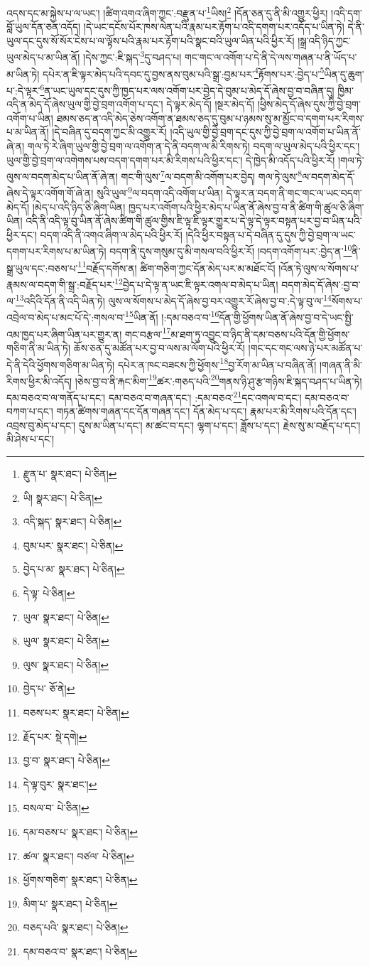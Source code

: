 འདས་དང་མ་སྐྱེས་པ་ལ་ཡང་། །ཚིག་འགའ་ཞིག་ཀྱང་:བརྫུན་པ་\footnote{རྫུན་པ་  སྣར་ཐང་།  པེ་ཅིན། }ཡིས།\footnote{ཡི།  སྣར་ཐང་།  པེ་ཅིན། } །དོན་ཅན་དུ་ནི་མི་འགྱུར་ཕྱིར། །འདི་དག་བློ་ཡུལ་དོན་ཅན་འདོད། །དེ་ཡང་དངོས་པོར་ཁས་ལེན་པའི་རྣམ་པར་རྟོག་པ་འདི་དགག་པར་འདོད་པ་ཡིན་ཏེ། དེ་ནི་ཡུལ་དང་དུས་སོ་སོར་ངེས་པ་ལ་ལྟོས་པའི་རྣམ་པར་རྟོག་པའི་སྣང་བའི་ཡུལ་ཡིན་པའི་ཕྱིར་རོ། །སྒྲ་འདི་ཉིད་ཀྱང་ཡུལ་མེད་པ་མ་ཡིན་ནོ། །དེས་ཀྱང་:ཇི་སྐད་\footnote{འདི་སྐད་  སྣར་ཐང་།  པེ་ཅིན། }དུ་བཤད་པ། གང་གང་ལ་འགོག་པ་དེ་ནི་དེ་ལས་གཞན་པ་ནི་ཡོད་པ་མ་ཡིན་ཏེ། དཔེར་ན་ཇི་ལྟར་མེད་པའི་དབང་དུ་བྱས་ནས་བུམ་པའི་སྒྲ་:བྱམ་པར་\footnote{བུམ་པར་  སྣར་ཐང་།  པེ་ཅིན། }རྟོགས་པར་:བྱེད་པ་\footnote{བྱེད་པ་མ་  སྣར་ཐང་།  པེ་ཅིན། }ཡིན་དུ་ཆུག་པ་:དེ་ལྟར་\footnote{དེ་ལྟ་  པེ་ཅིན། }ན་ཡང་ཡུལ་དང་དུས་ཀྱི་ཁྱད་པར་ལས་འགོག་པར་བྱེད་དེ་བུམ་པ་མེད་དོ་ཞེས་བྱ་བ་བཞིན་དུ། ཁྱིམ་འདི་ན་མེད་དོ་ཞེས་ཡུལ་གྱི་བྱེ་བྲག་འགོག་པ་དང་། དེ་ལྟར་མེད་དོ། །སྔར་མེད་དོ། །ཕྱིས་མེད་དོ་ཞེས་དུས་ཀྱི་བྱེ་བྲག་འགོག་པ་ཡིན། ཐམས་ཅད་ན་འདི་མེད་ཅེས་འགོག་ན་ཐམས་ཅད་དུ་བུམ་པ་ཉམས་སུ་མ་མྱོང་བ་དགག་པར་རིགས་པ་མ་ཡིན་ནོ། །དེ་བཞིན་དུ་བདག་ཀྱང་མི་འགྱུར་རོ། །འདི་ཡུལ་གྱི་བྱེ་བྲག་དང་དུས་ཀྱི་བྱེ་བྲག་ལ་འགོག་པ་ཡིན་ནོ་ཞེ་ན། གལ་ཏེ་རེ་ཞིག་ཡུལ་གྱི་བྱེ་བྲག་ལ་འགོག་ན་དེ་ནི་བདག་ལ་མི་རིགས་ཏེ། བདག་ལ་ཡུལ་མེད་པའི་ཕྱིར་དང་། ཡུལ་གྱི་བྱེ་བྲག་ལ་འགེགས་པས་བདག་དགག་པར་མི་རིགས་པའི་ཕྱིར་དང་། དེ་ཁྱེད་མི་འདོད་པའི་ཕྱིར་རོ། །གལ་ཏེ་ལུས་ལ་བདག་མེད་པ་ཡིན་ནོ་ཞེ་ན། གང་གི་ལུས་\footnote{ཡུལ་  སྣར་ཐང་།  པེ་ཅིན། }ལ་བདག་མི་འགོག་པར་བྱེད། གལ་ཏེ་ལུས་\footnote{ཡུལ་  སྣར་ཐང་།  པེ་ཅིན། }ལ་བདག་མེད་དོ་ཞེས་དེ་ལྟར་འགོག་གོ་ཞེ་ན། སུའི་ཡུལ་\footnote{ལུས་  སྣར་ཐང་།  པེ་ཅིན། }ལ་བདག་འདི་འགོག་པ་ཡིན། དེ་ལྟར་ན་བདག་ནི་གང་གང་ལ་ཡང་བདག་མེད་དོ། །མེད་པ་འདི་ཉིད་ཅི་ཞིག་ཡིན། ཁྱད་པར་འགོག་པའི་ཕྱིར་མེད་པ་ཡིན་ནོ་ཞེས་བྱ་བ་ནི་ཚིག་གི་ཚུལ་ཅི་ཞིག་ཡིན། འདི་ནི་འདི་ལྟ་བུ་ཡིན་ནོ་ཞེས་ཚིག་གི་ཚུལ་གྱིས་ཇི་ལྟ་ཇི་ལྟར་གྱུར་པ་དེ་ལྟ་དེ་ལྟར་བསྟན་པར་བྱ་བ་ཡིན་པའི་ཕྱིར་དང་། བདག་འདི་ནི་འགའ་ཞིག་ལ་མེད་པའི་ཕྱིར་རོ། །དེའི་ཕྱིར་བསྟན་པ་དེ་བཞིན་དུ་དུས་ཀྱི་བྱེ་བྲག་ལ་ཡང་དགག་པར་རིགས་པ་མ་ཡིན་ཏེ། བདག་ནི་དུས་གསུམ་དུ་མི་གསལ་བའི་ཕྱིར་རོ། །བདག་འགོག་པར་:བྱེད་ན་\footnote{བྱེད་པ་  ཅོ་ནེ། }ནི་སྒྲ་ཡུལ་དང་:བཅས་པ་\footnote{བཅས་པར་  སྣར་ཐང་།  པེ་ཅིན། }བརྗོད་དགོས་ན། ཚིག་གཅིག་ཀྱང་དོན་མེད་པར་མ་མཐོང་ངོ། །འོན་ཏེ་ལུས་ལ་སོགས་པ་རྣམས་ལ་བདག་གི་སྒྲ་:བརྗོད་པར་\footnote{རྗོད་པར་  སྡེ་དགེ། }བྱེད་པ་དེ་ལྟ་ན་ཡང་ཇི་ལྟར་འགལ་བ་མེད་པ་ཡིན། བདག་མེད་དོ་ཞེས་:བྱ་བ་ལ་\footnote{བྱ་བ་  སྣར་ཐང་།  པེ་ཅིན། }འདིའི་དོན་ནི་འདི་ཡིན་ཏེ། ལུས་ལ་སོགས་པ་མེད་དོ་ཞེས་བྱ་བར་འགྱུར་རོ་ཞེས་བྱ་བ་:དེ་ལྟ་བུ་ལ་\footnote{དེ་ལྟ་བུར་  སྣར་ཐང་། }སོགས་པ་འབྲེལ་བ་མེད་པ་མང་པོ་དེ་:གསལ་བ་\footnote{བསལ་བ་  པེ་ཅིན། }ཡིན་ནོ། །:དམ་བཅའ་བ་\footnote{དམ་བཅས་པ་  སྣར་ཐང་།  པེ་ཅིན། }དོན་གྱི་ཕྱོགས་ཡིན་ནོ་ཞེས་བྱ་བ་དེ་ཡང་སྤྱི་འམ་ཁྱད་པར་ཞིག་ཡིན་པར་གྱུར་ན། གང་བརྩལ་\footnote{ཚལ་  སྣར་ཐང་། བཙལ་  པེ་ཅིན། }མ་ཐག་ཏུ་འབྱུང་བ་ཉིད་ནི་དམ་བཅས་པའི་དོན་གྱི་ཕྱོགས་གཅིག་ནི་མ་ཡིན་ཏེ། ཆོས་ཅན་དུ་མཚོན་པར་བྱ་བ་ལས་མ་ལོག་པའི་ཕྱིར་རོ། །གང་དང་གང་ལས་ཉེ་པར་མཚོན་པ་དེ་ནི་དེའི་ཕྱོགས་གཅིག་མ་ཡིན་ཏེ། དཔེར་ན་ཁང་བཟངས་ཀྱི་ཕྱོགས་\footnote{ཕྱོགས་གཅིག་  སྣར་ཐང་།  པེ་ཅིན། }བྱ་རོག་མ་ཡིན་པ་བཞིན་ནོ། །གཞན་ནི་མི་རིགས་ཕྱིར་མི་འདོད། །ཅེས་བྱ་བ་ནི་རྐང་མིག་\footnote{མིག་པ་  སྣར་ཐང་།  པེ་ཅིན། }ཚར་:གཅད་པའི་\footnote{བཅད་པའི་  སྣར་ཐང་།  པེ་ཅིན། }གནས་ཉི་ཤུ་རྩ་གཉིས་ཇི་སྐད་བཤད་པ་ཡིན་ཏེ། དམ་བཅའ་བ་ལ་གནོད་པ་དང་། དམ་བཅའ་བ་གཞན་དང་། :དམ་བཅའ་\footnote{དམ་བཅའ་བ་  སྣར་ཐང་།  པེ་ཅིན། }དང་འགལ་བ་དང་། དམ་བཅའ་བ་བཀག་པ་དང་། གཏན་ཚིགས་གཞན་དང་དོན་གཞན་དང་། དོན་མེད་པ་དང་། རྣམ་པར་མི་རིགས་པའི་དོན་དང་། འབྲས་བུ་མེད་པ་དང་། དུས་མ་ཡིན་པ་དང་། མ་ཚང་བ་དང་། ལྷག་པ་དང་། ཟློས་པ་དང་། རྗེས་སུ་མ་བརྗོད་པ་དང་། མི་ཤེས་པ་དང་། 